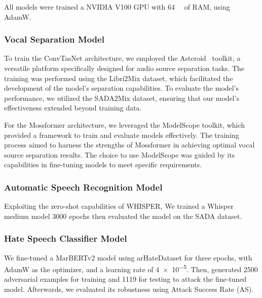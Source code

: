 \documentclass[10pt,twocolumn,letterpaper]{article}
\begin{document}
All models were trained a NVIDIA V100 GPU with \qty{64}{\giga\byte} of RAM, using AdamW.

\subsubsection{Vocal Separation Model}

To train the ConvTasNet architecture, we employed the Asteroid~\cite{parienteAsteroidPyTorchbasedAudio2020} toolkit, a versatile platform specifically designed for audio source separation tasks. The training was performed using the Libri2Mix dataset, which facilitated the development of the model's separation capabilities. To evaluate the model's performance, we utilized the SADA2Mix dataset, ensuring that our model's effectiveness extended beyond training data.

For the Mossformer architecture, we leveraged the ModelScope toolkit, which provided a framework to train and evaluate models effectively. The training process aimed to harness the strengths of Mossformer in achieving optimal vocal source separation results. The choice to use ModelScope was guided by its capabilities in fine-tuning models to meet specific requirements.

\subsubsection{Automatic Speech Recognition Model}

Exploiting the zero-shot capabilities of WHISPER, 
We trained a Whisper medium model 3000 epochs then evaluated the model on the SADA dataset.

\subsubsection{Hate Speech Classifier Model}

We fine-tuned a MarBERTv2 model using arHateDataset for three epochs, with AdamW as the optimizer, and a learning rate of \num{4e-5}.
Then, generated 2500 adversarial examples for training and 1119 for testing to attack the fine-tuned model.
Afterwards, we evaluated its robustness using Attack Success Rate (AS).
\end{document}
